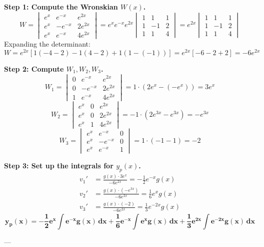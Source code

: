 \documentclass[12pt]{article}
\begin{document}
\textbf{Step 1: Compute the Wronskian $W(x)$.}
\[ W = \begin{vmatrix} e^x & e^{-x} & e^{2x} \\ e^x & -e^{-x} & 2e^{2x} \\ e^x & e^{-x} & 4e^{2x} \end{vmatrix} = e^x e^{-x} e^{2x} \begin{vmatrix} 1 & 1 & 1 \\ 1 & -1 & 2 \\ 1 & 1 & 4 \end{vmatrix} = e^{2x} \begin{vmatrix} 1 & 1 & 1 \\ 1 & -1 & 2 \\ 1 & 1 & 4 \end{vmatrix} \]
Expanding the determinant:
\[ W = e^{2x} [1(-4 - 2) - 1(4 - 2) + 1(1 - (-1))] = e^{2x}[-6 - 2 + 2] = -6e^{2x} \]

\textbf{Step 2: Compute $W_1, W_2, W_3$.}
\[ W_1 = \begin{vmatrix} 0 & e^{-x} & e^{2x} \\ 0 & -e^{-x} & 2e^{2x} \\ 1 & e^{-x} & 4e^{2x} \end{vmatrix} = 1 \cdot (2e^x - (-e^x)) = 3e^x \]
\[ W_2 = \begin{vmatrix} e^x & 0 & e^{2x} \\ e^x & 0 & 2e^{2x} \\ e^x & 1 & 4e^{2x} \end{vmatrix} = -1 \cdot (2e^{3x} - e^{3x}) = -e^{3x} \]
\[ W_3 = \begin{vmatrix} e^x & e^{-x} & 0 \\ e^x & -e^{-x} & 0 \\ e^x & e^{-x} & 1 \end{vmatrix} = 1 \cdot (-1 - 1) = -2 \]

\textbf{Step 3: Set up the integrals for $y_p(x)$.}
\begin{align*}
v_1' &= \frac{g(x) \cdot 3e^x}{-6e^{2x}} = -\frac{1}{2}e^{-x}g(x) \\
v_2' &= \frac{g(x) \cdot (-e^{3x})}{-6e^{2x}} = \frac{1}{6}e^x g(x) \\
v_3' &= \frac{g(x) \cdot (-2)}{-6e^{2x}} = \frac{1}{3}e^{-2x}g(x)
\end{align*}
\[ \mathbf{y_p(x) = -\frac{1}{2}e^x \int e^{-x}g(x) \, dx + \frac{1}{6}e^{-x} \int e^x g(x) \, dx + \frac{1}{3}e^{2x} \int e^{-2x}g(x) \, dx} \]

---
\end{document}
